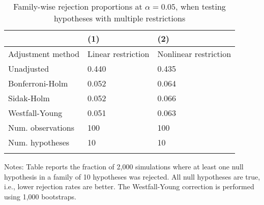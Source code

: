 \documentclass{article}
\begin{document}
\begin{table}[tbp] \centering
{}

\caption{Family-wise rejection proportions at \(\alpha = 0.05\), when testing hypotheses with multiple restrictions}
\label{tab:wyoung3}
\begin{tabularx}{\linewidth}{lCC}

\toprule
&{(1)}&{(2)} \tabularnewline \midrule
{Adjustment method}&{Linear restriction}&{Nonlinear restriction} \tabularnewline
\midrule \addlinespace[\belowrulesep]
Unadjusted&0.440&0.435 \tabularnewline
Bonferroni-Holm&0.052&0.064 \tabularnewline
Sidak-Holm&0.052&0.066 \tabularnewline
Westfall-Young&0.051&0.063 \tabularnewline
\midrule Num. observations&100&100 \tabularnewline
Num. hypotheses&10&10 \tabularnewline
\bottomrule \addlinespace[\belowrulesep]

\end{tabularx}
\begin{flushleft}
\footnotesize Notes: Table reports the fraction of 2,000 simulations where at least one null hypothesis in a family of 10 hypotheses was rejected. All null hypotheses are true, i.e., lower rejection rates are better. The Westfall-Young correction is performed using 1,000 bootstraps.
\end{flushleft}
\end{table}
\end{document}
